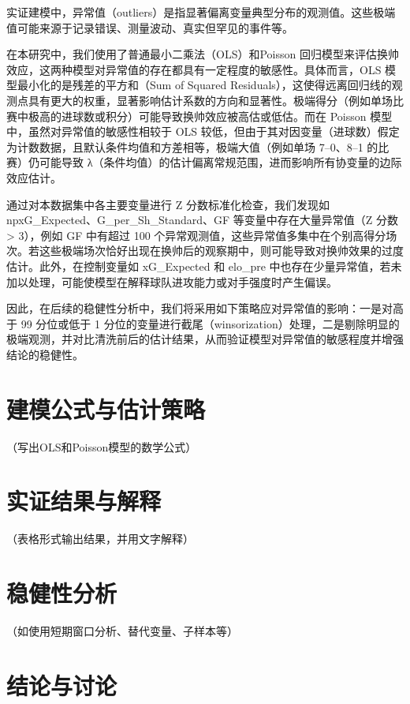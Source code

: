 \documentclass[
]{ctexart}
\begin{document}
实证建模中，异常值（outliers）是指显著偏离变量典型分布的观测值。这些极端值可能来源于记录错误、测量波动、真实但罕见的事件等。

在本研究中，我们使用了普通最小二乘法（OLS）和Poisson
回归模型来评估换帅效应，这两种模型对异常值的存在都具有一定程度的敏感性。具体而言，OLS
模型最小化的是残差的平方和（Sum of Squared
Residuals），这使得远离回归线的观测点具有更大的权重，显著影响估计系数的方向和显著性。极端得分（例如单场比赛中极高的进球数或积分）可能导致换帅效应被高估或低估。而在
Poisson 模型中，虽然对异常值的敏感性相较于 OLS
较低，但由于其对因变量（进球数）假定为计数数据，且默认条件均值和方差相等，极端大值（例如单场
7--0、8--1 的比赛）仍可能导致
λ（条件均值）的估计偏离常规范围，进而影响所有协变量的边际效应估计。

通过对本数据集中各主要变量进行 Z 分数标准化检查，我们发现如
npxG\_Expected、G\_per\_Sh\_Standard、GF 等变量中存在大量异常值（Z 分数
\textgreater{} 3），例如 GF 中有超过 100
个异常观测值，这些异常值多集中在个别高得分场次。若这些极端场次恰好出现在换帅后的观察期中，则可能导致对换帅效果的过度估计。此外，在控制变量如
xG\_Expected 和 elo\_pre
中也存在少量异常值，若未加以处理，可能使模型在解释球队进攻能力或对手强度时产生偏误。

因此，在后续的稳健性分析中，我们将采用如下策略应对异常值的影响：一是对高于
99 分位或低于 1
分位的变量进行截尾（winsorization）处理，二是剔除明显的极端观测，并对比清洗前后的估计结果，从而验证模型对异常值的敏感程度并增强结论的稳健性。

\section{建模公式与估计策略}\label{ux5efaux6a21ux516cux5f0fux4e0eux4f30ux8ba1ux7b56ux7565}

（写出OLS和Poisson模型的数学公式）

\section{实证结果与解释}\label{ux5b9eux8bc1ux7ed3ux679cux4e0eux89e3ux91ca}

（表格形式输出结果，并用文字解释）

\section{稳健性分析}\label{ux7a33ux5065ux6027ux5206ux6790}

（如使用短期窗口分析、替代变量、子样本等）

\section{结论与讨论}\label{ux7ed3ux8bbaux4e0eux8ba8ux8bba}
\end{document}
